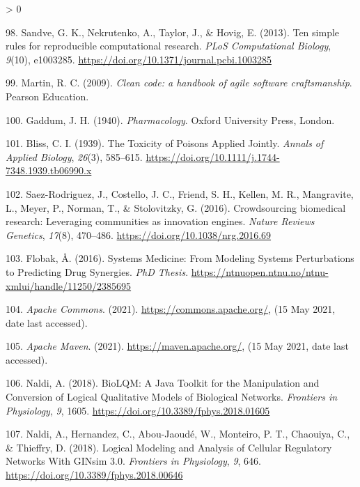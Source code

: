 \documentclass[
  12pt,
]{book}
\newlength{\cslhangindent}
\newenvironment{CSLReferences}[2] %
 {%
  \setlength{\parindent}{0pt}
  \ifodd #1 \everypar{\setlength{\hangindent}{\cslhangindent}}\ignorespaces\fi
  \ifnum #2 > 0
  \setlength{\parskip}{#2\baselineskip}
  \fi
 }%
 {}
\begin{document}
\begin{CSLReferences}{1}{0}
\leavevmode\hypertarget{ref-Sandve2013}{}%
98. Sandve, G. K., Nekrutenko, A., Taylor, J., \& Hovig, E. (2013). {Ten simple rules for reproducible computational research}. \emph{PLoS Computational Biology}, \emph{9}(10), e1003285. \url{https://doi.org/10.1371/journal.pcbi.1003285}

\leavevmode\hypertarget{ref-Martin2009}{}%
99. Martin, R. C. (2009). \emph{{Clean code: a handbook of agile software craftsmanship}}. Pearson Education.

\leavevmode\hypertarget{ref-gaddum1940pharmacology}{}%
100. Gaddum, J. H. (1940). \emph{{Pharmacology}}. Oxford University Press, London.

\leavevmode\hypertarget{ref-Bliss1939}{}%
101. Bliss, C. I. (1939). {The Toxicity of Poisons Applied Jointly}. \emph{Annals of Applied Biology}, \emph{26}(3), 585--615. \url{https://doi.org/10.1111/j.1744-7348.1939.tb06990.x}

\leavevmode\hypertarget{ref-Saez-Rodriguez2016}{}%
102. Saez-Rodriguez, J., Costello, J. C., Friend, S. H., Kellen, M. R., Mangravite, L., Meyer, P., Norman, T., \& Stolovitzky, G. (2016). {Crowdsourcing biomedical research: Leveraging communities as innovation engines}. \emph{Nature Reviews Genetics}, \emph{17}(8), 470--486. \url{https://doi.org/10.1038/nrg.2016.69}

\leavevmode\hypertarget{ref-Flobak2016}{}%
103. Flobak, Å. (2016). {Systems Medicine: From Modeling Systems Perturbations to Predicting Drug Synergies}. \emph{PhD Thesis}. \url{https://ntnuopen.ntnu.no/ntnu-xmlui/handle/11250/2385695}

\leavevmode\hypertarget{ref-ApacheCommons}{}%
104. \emph{{Apache Commons}}. (2021). \url{https://commons.apache.org/}, (15 May 2021, date last accessed).

\leavevmode\hypertarget{ref-Maven}{}%
105. \emph{{Apache Maven}}. (2021). \url{https://maven.apache.org/}, (15 May 2021, date last accessed).

\leavevmode\hypertarget{ref-Naldi2018}{}%
106. Naldi, A. (2018). {BioLQM: A Java Toolkit for the Manipulation and Conversion of Logical Qualitative Models of Biological Networks}. \emph{Frontiers in Physiology}, \emph{9}, 1605. \url{https://doi.org/10.3389/fphys.2018.01605}

\leavevmode\hypertarget{ref-Naldi2018b}{}%
107. Naldi, A., Hernandez, C., Abou-Jaoudé, W., Monteiro, P. T., Chaouiya, C., \& Thieffry, D. (2018). {Logical Modeling and Analysis of Cellular Regulatory Networks With GINsim 3.0}. \emph{Frontiers in Physiology}, \emph{9}, 646. \url{https://doi.org/10.3389/fphys.2018.00646}


\end{CSLReferences}
\end{document}
